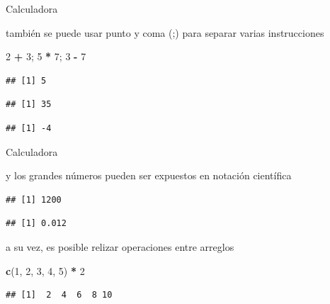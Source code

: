 \documentclass[ignorenonframetext,]{beamer}
\newenvironment{Shaded}{\begin{snugshade}}{\end{snugshade}}
\newcommand{\KeywordTok}[1]{\textcolor[rgb]{0.13,0.29,0.53}{\textbf{#1}}}
\newcommand{\DecValTok}[1]{\textcolor[rgb]{0.00,0.00,0.81}{#1}}
\newcommand{\FloatTok}[1]{\textcolor[rgb]{0.00,0.00,0.81}{#1}}
\newcommand{\StringTok}[1]{\textcolor[rgb]{0.31,0.60,0.02}{#1}}
\newcommand{\CommentTok}[1]{\textcolor[rgb]{0.56,0.35,0.01}{\textit{#1}}}
\newcommand{\OperatorTok}[1]{\textcolor[rgb]{0.81,0.36,0.00}{\textbf{#1}}}
\newcommand{\NormalTok}[1]{#1}
\begin{document}
\begin{frame}[fragile]{Calculadora}

también se puede usar punto y coma (;) para separar varias instrucciones

\begin{Shaded}
\begin{Highlighting}[]
\DecValTok{2} \OperatorTok{+}\StringTok{ }\DecValTok{3}\NormalTok{; }\DecValTok{5} \OperatorTok{*}\StringTok{ }\DecValTok{7}\NormalTok{; }\DecValTok{3} \OperatorTok{-}\StringTok{ }\DecValTok{7}
\end{Highlighting}
\end{Shaded}

\begin{verbatim}
## [1] 5
\end{verbatim}

\begin{verbatim}
## [1] 35
\end{verbatim}

\begin{verbatim}
## [1] -4
\end{verbatim}

\end{frame}

\begin{frame}[fragile]{Calculadora}

y los grandes números pueden ser expuestos en notación científica

\begin{Shaded}
\end{Shaded}

\begin{verbatim}
## [1] 1200
\end{verbatim}

\begin{Shaded}
\end{Shaded}

\begin{verbatim}
## [1] 0.012
\end{verbatim}

a su vez, es posible relizar operaciones entre arreglos

\begin{Shaded}
\begin{Highlighting}[]
\KeywordTok{c}\NormalTok{(}\DecValTok{1}\NormalTok{, }\DecValTok{2}\NormalTok{, }\DecValTok{3}\NormalTok{, }\DecValTok{4}\NormalTok{, }\DecValTok{5}\NormalTok{) }\OperatorTok{*}\StringTok{ }\DecValTok{2}
\end{Highlighting}
\end{Shaded}

\begin{verbatim}
## [1]  2  4  6  8 10
\end{verbatim}

\end{frame}
\end{document}
